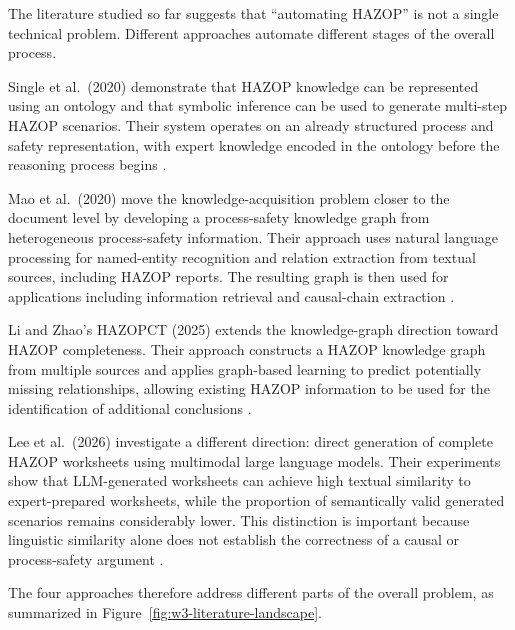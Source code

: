 The literature studied so far suggests that ``automating HAZOP'' is not a
single technical problem. Different approaches automate different stages of
the overall process.

Single et al.\ (2020) demonstrate that HAZOP knowledge can be represented
using an ontology and that symbolic inference can be used to generate
multi-step HAZOP scenarios. Their system operates on an already structured
process and safety representation, with expert knowledge encoded in the
ontology before the reasoning process begins
\cite{single2020ontologyhazop}.

Mao et al.\ (2020) move the knowledge-acquisition problem closer to the
document level by developing a process-safety knowledge graph from
heterogeneous process-safety information. Their approach uses natural
language processing for named-entity recognition and relation extraction
from textual sources, including HAZOP reports. The resulting graph is then
used for applications including information retrieval and causal-chain
extraction \cite{mao2020processsafetykg}.

Li and Zhao's HAZOPCT (2025) extends the knowledge-graph direction toward
HAZOP completeness. Their approach constructs a HAZOP knowledge graph from
multiple sources and applies graph-based learning to predict potentially
missing relationships, allowing existing HAZOP information to be used for
the identification of additional conclusions
\cite{lizhao2025hazopct}.

Lee et al.\ (2026) investigate a different direction: direct generation of
complete HAZOP worksheets using multimodal large language models. Their
experiments show that LLM-generated worksheets can achieve high textual
similarity to expert-prepared worksheets, while the proportion of semantically
valid generated scenarios remains considerably lower. This distinction is
important because linguistic similarity alone does not establish the
correctness of a causal or process-safety argument
\cite{lee2026llmhazop}.

The four approaches therefore address different parts of the overall problem,
as summarized in Figure~\ref{fig:w3-literature-landscape}.

